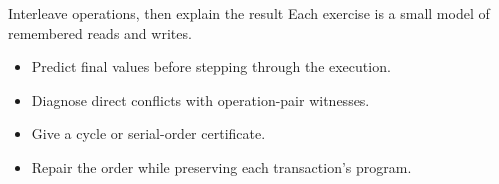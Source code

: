 \begin{frame}[t]{Interleave operations, then explain the result}
Each exercise is a small model of remembered reads and writes.
\medskip
\begin{itemize}
\item Predict final values before stepping through the execution.
\item Diagnose direct conflicts with operation-pair witnesses.
\item Give a cycle or serial-order certificate.
\item Repair the order while preserving each transaction's program.
\end{itemize}
\end{frame}
